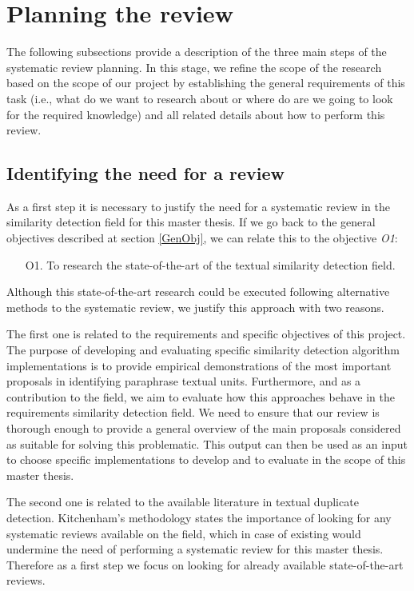 \section{Planning the review}
\label{Planning}

The following subsections provide a description of the three main steps of the systematic review planning. In this stage, we refine the scope of the research based on the scope of our project by establishing the general requirements of this task (i.e., what do we want to research about or where do are we going to look for the required knowledge) and all related details about how to perform this review.

\subsection{Identifying the need for a review}
\label{need}

As a first step it is necessary to justify the need for a systematic review in the similarity detection field for this master thesis. If we go back to the general objectives described at section \ref{GenObj}, we can relate this to the objective \textit{O1}:

\begin{itemize}
\item[O1.] To research the state-of-the-art of the textual similarity detection field.
\end{itemize}

Although this state-of-the-art research could be executed following alternative methods to the systematic review, we justify this approach with two reasons.

The first one is related to the requirements and specific objectives of this project. The purpose of developing and evaluating specific similarity detection algorithm implementations is to provide empirical demonstrations of the most important proposals in identifying paraphrase textual units. Furthermore, and as a contribution to the field, we aim to evaluate how this approaches behave in the requirements similarity detection field. We need to ensure that our review is thorough enough to provide a general overview of the main proposals considered as suitable for solving this problematic. This output can then be used as an input to choose specific implementations to develop and to evaluate in the scope of this master thesis.

The second one is related to the available literature in textual duplicate detection. Kitchenham's methodology states the importance of looking for any systematic reviews available on the field, which in case of existing would undermine the need of performing a systematic review for this master thesis. Therefore as a first step we focus on looking for already available state-of-the-art reviews.

